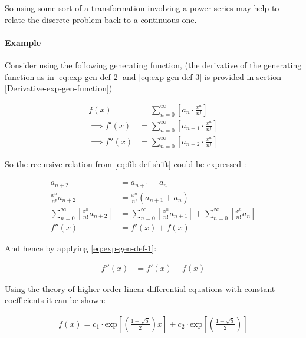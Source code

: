 \documentclass[11pt]{article}
\begin{document}
So using some sort of a transformation involving a power series may help to
relate the discrete problem back to a continuous one.

\paragraph{Example}
\label{solving-the-sequence}
Consider using the following generating function, (the derivative of the
generating function as in \eqref{eq:exp-gen-def-2} and \eqref{eq:exp-gen-def-3} is
provided in section \ref{Derivative-exp-gen-function})




\begin{align}
    f\left( x \right) &=  \sum^{\infty}_{n= 0}   \left[ a_{n} \cdot  \frac{x^n}{n!} \right]   \label{eq:exp-gen-def-1} \\
 \implies   f'\left( x \right) &=  \sum^{\infty}_{n= 0}   \left[ a_{n+1} \cdot  \frac{x^n}{n!} \right]   \label{eq:exp-gen-def-2} \\
\implies    f''\left( x \right) &=  \sum^{\infty}_{n= 0}   \left[ a_{n+2} \cdot  \frac{x^n}{n!} \right]   \label{eq:exp-gen-def-3}
\end{align}


So the recursive relation from \eqref{eq:fib-def-shift}  could be expressed :


\begin{align*}
a_{n+  2}    &= a_{n+  1} +  a_{n}\\
\frac{x^n}{n!}   a_{n+  2}    &= \frac{x^n}{n!}\left( a_{n+  1} +  a_{n}  \right)\\
\sum^{\infty}_{n= 0} \left[ \frac{x^n}{n!}   a_{n+  2} \right]        &= \sum^{\infty}_{n= 0}   \left[ \frac{x^n}{n!} a_{n+  1} \right]  + \sum^{\infty}_{n= 0}   \left[ \frac{x^n}{n!} a_{n}  \right]  \\
f''\left( x \right) &= f'\left( x \right)+  f\left( x \right)
\end{align*}

And hence by applying \eqref{eq:exp-gen-def-1}:

\begin{align}
f''\left( x \right) &= f'\left( x \right)+  f\left( x \right)
\end{align}


Using the theory of higher order linear differential equations with
constant coefficients it can be shown:


\begin{align*}
f\left( x \right)= c_1 \cdot  \mathrm{exp}\left[ \left( \frac{1- \sqrt{5} }{2} \right)x \right] +  c_2 \cdot  \mathrm{exp}\left[ \left( \frac{1 +  \sqrt{5} }{2} \right) \right]
\end{align*}
\end{document}
